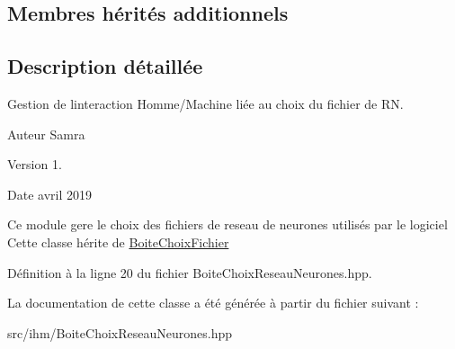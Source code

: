 \subsection*{Membres hérités additionnels}


\subsection{Description détaillée}
Gestion de l\textquotesingle{}interaction Homme/\+Machine liée au choix du fichier de RN. 

\begin{DoxyAuthor}{Auteur}
Samra 
\end{DoxyAuthor}
\begin{DoxyVersion}{Version}
1. 
\end{DoxyVersion}
\begin{DoxyDate}{Date}
avril 2019
\end{DoxyDate}
Ce module gere le choix des fichiers de reseau de neurones utilisés par le logiciel Cette classe hérite de \hyperlink{class_boite_choix_fichier}{Boite\+Choix\+Fichier} 

Définition à la ligne 20 du fichier Boite\+Choix\+Reseau\+Neurones.\+hpp.



La documentation de cette classe a été générée à partir du fichier suivant \+:\begin{DoxyCompactItemize}
\item 
src/ihm/Boite\+Choix\+Reseau\+Neurones.\+hpp\end{DoxyCompactItemize}
